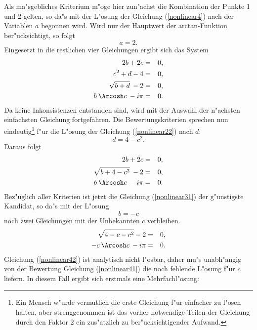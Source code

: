 Als ma"sgebliches Kriterium m"oge hier zun"achst die Kombination der
Punkte 1 und 2 gelten, so  da"s mit der L"osung der Gleichung 
(\ref{nonlinear4}) nach der Variablen $a$ begonnen wird. Wird nur der 
Hauptwert der arctan-Funktion ber"ucksichtigt, so folgt
\begin{equation}
a = 2.
\end{equation}
Eingesetzt in die restlichen vier Gleichungen ergibt sich das System
\begin{eqnarray}
                  2b + 2c &=& 0,  \label{nonlinear21} \\
             c^2 + d -  4 &=& 0,  \label{nonlinear22} \\
     \sqrt{b + d} \: -  2 &=& 0,  \\
b \: \Arcosh c \: - i \pi &=& 0.  \label{nonlinear24}
\end{eqnarray}
Da keine Inkonsistenzen entstanden sind, wird mit der Auswahl der  n"achsten
einfachsten Gleichung fortgefahren. Die Bewertungskriterien  sprechen nun
eindeutig\footnote{Ein Mensch w"urde vermutlich die erste Gleichung f"ur
einfacher zu l"osen halten, aber strenggenommen ist das vorher notwendige
Teilen der Gleichung durch den Faktor 2 ein zus"atzlich zu
ber"ucksichtigender Aufwand.} f"ur die L"osung der Gleichung
(\ref{nonlinear22}) nach $d$:
\begin{equation}
d = 4 - c^2.
\end{equation}
Daraus folgt
\begin{eqnarray}
                    2b + 2c &=& 0,  \label{nonlinear31} \\
 \sqrt{b + 4 - c^2} \: -  2 &=& 0,  \\
  b \: \Arcosh c \: - i \pi &=& 0.  \label{nonlinear33}
\end{eqnarray}
Bez"uglich aller Kriterien ist jetzt die Gleichung (\ref{nonlinear31}) der
g"unstigste Kandidat, so da"s mit der L"osung
\begin{equation}
b = -c
\end{equation}
noch zwei Gleichungen mit der Unbekannten $c$ verbleiben.
\begin{eqnarray}
    \sqrt{4 - c - c^2} -  2 &=& 0,  \label{nonlinear41} \\
 -c \: \Arcosh c \: - i \pi &=& 0.  \label{nonlinear42}
\end{eqnarray}
Gleichung (\ref{nonlinear42}) ist analytisch nicht l"osbar, daher mu"s
unabh"angig von der Bewertung Gleichung (\ref{nonlinear41}) die noch fehlende
L"osung f"ur $c$ liefern. In diesem Fall ergibt sich erstmals eine
Mehrfachl"osung:
